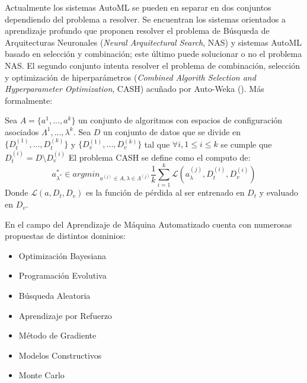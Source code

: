 Actualmente los sistemas AutoML se pueden en separar en dos conjuntos dependiendo del problema a resolver. Se encuentran los sistemas orientados a aprendizaje profundo que proponen resolver el problema de B\'usqueda de Arquitecturas Neuronales (\textit{Neural Arquitectural Search}, NAS) y  sistemas AutoML basado en selecci\'on y combinaci\'on; este \'ultimo puede solucionar o no el problema NAS. El segundo conjunto intenta resolver el problema de combinaci\'on, selecci\'on y optimizaci\'on de hiperpar\'ametros (\textit{Combined Algorith Selection and Hyperparameter Optimization}, CASH) acuñado por Auto-Weka (\cite{thornton2013auto}). M\'as formalmente:
\begin{definition}
    Sea $A = \{a^1, ..., a^k\}$  un conjunto de algoritmos con espacios de configuraci\'on asociados $\Lambda^1, ..., \lambda^k$.
    Sea $D$ un conjunto de datos  que se divide en $\{D_{t}^{(1)},..., D_{t}^{(k)}\}$ y $\{D_{v}^{(1)},..., D_{v}^{(k)}\}$ 
    tal que $\forall i, 1 \leq i \leq k$ se cumple que $D_{t}^{(i)} = D \setminus D^{(i)}_{v}$
    El problema CASH se define como el computo de:
    \begin{equation*}
        a^*_{\lambda^*} \in argmin_{a^{(j)} \in A, \lambda \in \Lambda^{(j)}} \frac{1}{k} \sum^{k}_{i = 1}\mathcal{L}(a^(j)_\lambda, D^{(i)}_t, D^{(i)}_v)
    \end{equation*}
    Donde $\mathcal{L}(a, D_t, D_v)$ es la funci\'on de p\'erdida al ser entrenado en $D_t$ y evaluado en $D_v$.
\end{definition}



En el campo del Aprendizaje de M\'aquina Automatizado cuenta con numerosas propuestas de distintos dominios: 
\begin{itemize}
    \item Optimizaci\'on Bayesiana%
    \item Programaci\'on Evolutiva%
    \item B\'usqueda Aleatoria 
    \item Aprendizaje por Refuerzo
    \item M\'etodo de Gradiente
    \item Modelos Constructivos
    \item Monte Carlo
\end{itemize}

